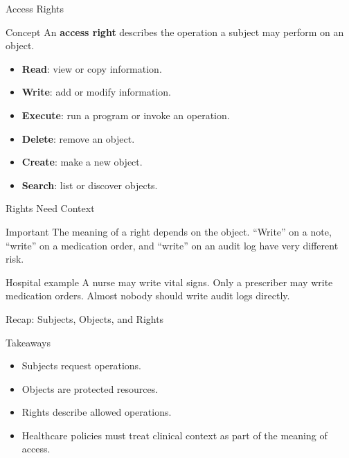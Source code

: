 \documentclass[presentation]{beamer}
\begin{document}
\begin{frame}[c]{Access Rights}
\begin{block}{Concept}
An \textbf{access right} describes the operation a subject may perform on an object.
\end{block}

\begin{itemize}
    \item \textbf{Read}: view or copy information.
    \item \textbf{Write}: add or modify information.
    \item \textbf{Execute}: run a program or invoke an operation.
    \item \textbf{Delete}: remove an object.
    \item \textbf{Create}: make a new object.
    \item \textbf{Search}: list or discover objects.
\end{itemize}
\end{frame}

\begin{frame}[c]{Rights Need Context}
\begin{block}{Important}
The meaning of a right depends on the object. ``Write'' on a note, ``write'' on a medication
order, and ``write'' on an audit log have very different risk.
\end{block}

\begin{exampleblock}{Hospital example}
A nurse may write vital signs. Only a prescriber may write medication orders. Almost nobody should
write audit logs directly.
\end{exampleblock}
\end{frame}

\begin{frame}[c]{Recap: Subjects, Objects, and Rights}
\begin{block}{Takeaways}
\begin{itemize}
    \item Subjects request operations.
    \item Objects are protected resources.
    \item Rights describe allowed operations.
    \item Healthcare policies must treat clinical context as part of the meaning of access.
\end{itemize}
\end{block}
\end{frame}
\end{document}
